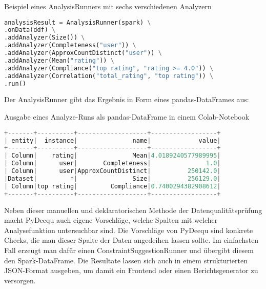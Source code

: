 \begin{code}
\caption{Beispiel eines AnalysisRunners mit sechs verschiedenen Analyzern}

\begin{lstlisting}[language=Python]
analysisResult = AnalysisRunner(spark) \
.onData(ddf) \
.addAnalyzer(Size()) \
.addAnalyzer(Completeness("user")) \
.addAnalyzer(ApproxCountDistinct("user")) \
.addAnalyzer(Mean("rating")) \
.addAnalyzer(Compliance("top rating", "rating >= 4.0")) \
.addAnalyzer(Correlation("total_rating", "top rating")) \
.run()
\end{lstlisting}
\end{code}


Der AnalysisRunner gibt das Ergebnis in Form eines pandas-DataFrames aus:

\medskip



\medskip

\begin{code}
    \caption{Ausgabe eines Analyze-Runs als pandas-DataFrame in einem Colab-Notebook}

\begin{lstlisting}[language=Python]
+-------+----------+-------------------+------------------+
| entity|  instance|               name|             value|
+-------+----------+-------------------+------------------+
| Column|    rating|               Mean|4.0189240577989995|
| Column|      user|       Completeness|               1.0|
| Column|      user|ApproxCountDistinct|          250142.0|
|Dataset|         *|               Size|          256129.0|
| Column|top rating|         Compliance|0.7400294382908612|
+-------+----------+-------------------+------------------+
\end{lstlisting}
\end{code}


Neben dieser manuellen und deklaratorischen Methode der Datenqualitätsprüfung macht PyDeequ auch eigene Vorschläge, welche Spalten mit welcher Analysefunktion untersuchbar sind. Die Vorschläge von PyDeequ sind konkrete Checks, die man dieser Spalte der Daten angedeihen lassen sollte. Im einfachsten Fall erzeugt man dafür einen ConstraintSuggestionRunner und übergibt diesem den Spark-DataFrame. Die Resultate lassen sich auch in einem strukturierten JSON-Format ausgeben, um damit ein Frontend oder einen Berichtsgenerator zu versorgen.

